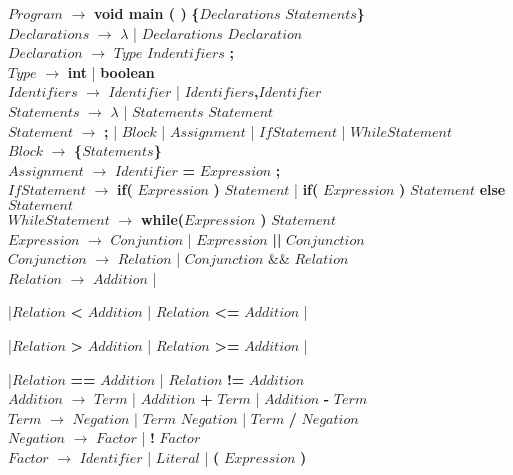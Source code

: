 \noindent$Program$ $\rightarrow$ {\bf void main ( )} {\bf \{}$Declarations$ $Statements${\bf \} } \\
$Declarations$ $\rightarrow$ $\lambda$ | $Declarations$ $Declaration$\\
$Declaration$ $\rightarrow$ $Type$ $Indentifiers$ {\bf ;}\\
$Type$ $\rightarrow$ {\bf int} | {\bf boolean}\\
$Identifiers$ $\rightarrow$ $Identifier$ | $Identifiers${\bf ,}$Identifier$\\
$Statements$ $\rightarrow$ $\lambda$ | $Statements$ $Statement$\\
$Statement$ $\rightarrow$ {\bf ;} | $Block$ | $Assignment$ | $IfStatement$ | $WhileStatement$\\
$Block$ $\rightarrow$ {\bf \{}$Statements${\bf \}}\\
$Assignment$ $\rightarrow$ $Identifier$ {\bf =} $Expression$ {\bf ;}\\
$IfStatement$ $\rightarrow$ {\bf if(} $Expression$ {\bf )} $Statement$ | {\bf if(} $Expression$ {\bf )} $Statement$ {\bf else} $Statement$\\
$WhileStatement$ $\rightarrow$ {\bf while(}$Expression$ {\bf )} $Statement$\\
$Expression$ $\rightarrow$ $Conjuntion$ | $Expression$ {\bf ||} $Conjunction$\\
$Conjunction$ $\rightarrow$ $Relation$ | $Conjunction$ \&\& $Relation$\\
$Relation$ $\rightarrow$ $Addition$ |

\hspace{1.5cm} |$Relation$ {\bf <} $Addition$ | $Relation$ {\bf <=} $Addition$ |

\hspace{1.5cm} |$Relation$ {\bf >} $Addition$ | $Relation$ {\bf >=} $Addition$ |

\hspace{1.5cm} |$Relation$ {\bf ==} $Addition$ | $Relation$ {\bf !=} $Addition$\\ 
$Addition$ $\rightarrow$  $Term$ | $Addition$ {\bf +} $Term$ | $Addition$ {\bf -} $Term$\\
$Term$ $\rightarrow$ $Negation$ | $Term$ {\bf *} $Negation$ | $Term$ {\bf /} $Negation$\\
$Negation$ $\rightarrow$ $Factor$ | {\bf !} $Factor$\\
$Factor$ $\rightarrow$ $Identifier$ | $Literal$ | {\bf (} $Expression$ {\bf )}\\

